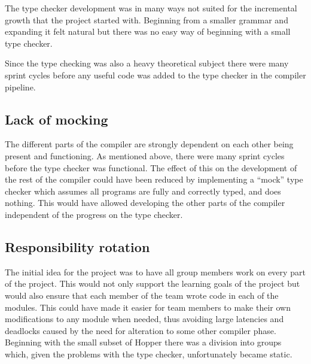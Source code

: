 The type checker development was in many ways not suited for the incremental growth that the project started with. Beginning from a smaller grammar and expanding it felt natural but there was no easy way of beginning with a small type checker. 

Since the type checking was also a heavy theoretical subject there were many sprint cycles before any useful code was added to the type checker in the compiler pipeline. 

\subsection{Lack of mocking}

The different parts of the compiler are strongly dependent on each other being present and functioning. As mentioned above, there were many sprint cycles before the type checker was functional. The effect of this on the development of the rest of the compiler could have been reduced by implementing a ``mock'' type checker which assumes all programs are fully and correctly typed, and does nothing. This would have allowed developing the other parts of the compiler independent of the progress on the type checker.

\subsection{Responsibility rotation}

The initial idea for the project was to have all group members work on every part of the project. This would not only support the learning goals of the project but would also ensure that each member of the team wrote code in each of the modules. This could have made it easier for team members to make their own modifications to any module when needed, thus avoiding large latencies and deadlocks caused by the need for alteration to some other compiler phase. 
Beginning with the small subset of Hopper there was a division into groups which, given the problems with the type checker, unfortunately became static.
